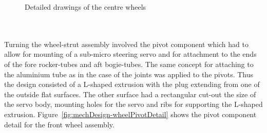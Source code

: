         \begin{figure}[h!]
        \centering
        \qquad
        \caption[Detailed drawings of the centre wheels]{Detailed drawings of the centre wheels}
        \label{fig:mechDesign-midWheelDetail}
        \end{figure}
          
      \\\\
        Turning the wheel-strut assembly involved the pivot component which had to allow for mounting of a sub-micro steering servo and for attachment to the ends of the fore rocker-tubes and aft bogie-tubes. The same concept for attaching to the aluminium tube as in the case of the joints was applied to the pivots. Thus the design consisted of a L-shaped extrusion with the plug extending from one of the outside flat surfaces. The other surface had a rectangular cut-out the size of the servo body, mounting holes for the servo and ribs for supporting the L-shaped extrusion. Figure~\ref{fig:mechDesign-wheelPivotDetail} shows the pivot component detail for the front wheel assembly.
        
